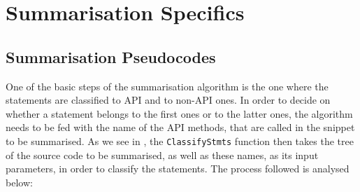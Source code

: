 \chapter{Summarisation Specifics}
\label{chap:summarisation-specifics}

\section{Summarisation Pseudocodes}
\label{sec:summarisation-pseudocodes}

One of the basic steps of the summarisation algorithm is the one where the statements are classified to API and to non-API ones. In order to decide on whether a statement belongs to the first ones or to the latter ones, the algorithm needs to be fed with the name of the API methods, that are called in the snippet to be summarised. As we see in , the \texttt{ClassifyStmts} function then takes the tree of the source code to be summarised, as well as these names, as its input parameters, in order to classify the statements. The process followed is analysed below:

